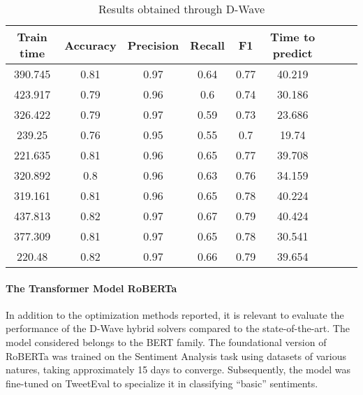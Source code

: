 \begin{table}[H]
    \centering
    \begin{tabular}{ccccccccc}
    \toprule
    Train time & Accuracy & Precision & Recall & F1    & Time to predict \\
    \midrule
    390.745    & 0.81     & 0.97      & 0.64   & 0.77  & 40.219          \\
    423.917    & 0.79     & 0.96      & 0.6    & 0.74  & 30.186          \\
    326.422    & 0.79     & 0.97      & 0.59   & 0.73  & 23.686          \\
    239.25     & 0.76     & 0.95      & 0.55   & 0.7   & 19.74           \\
    221.635    & 0.81     & 0.96      & 0.65   & 0.77  & 39.708          \\
    320.892    & 0.8      & 0.96      & 0.63   & 0.76  & 34.159          \\
    319.161    & 0.81     & 0.96      & 0.65   & 0.78  & 40.224          \\
    437.813    & 0.82     & 0.97      & 0.67   & 0.79  & 40.424          \\
    377.309    & 0.81     & 0.97      & 0.65   & 0.78  & 30.541          \\
    220.48     & 0.82     & 0.97      & 0.66   & 0.79  & 39.654          \\
    \bottomrule
    \end{tabular}
    \caption{Results obtained through D-Wave}
    \label{tab:QSVM2}
\end{table}

\paragraph{The Transformer Model RoBERTa} In addition to the optimization methods reported, it is relevant to evaluate the performance of the D-Wave hybrid solvers compared to the state-of-the-art. The model considered belongs to the BERT family. The foundational version of RoBERTa\cite{roberta-base} was trained on the Sentiment Analysis task using datasets of various natures, taking approximately 15 days to converge. Subsequently, the model was fine-tuned on TweetEval\cite{tweetRoberta}\cite{robertamodel} to specialize it in classifying ``basic'' sentiments.

